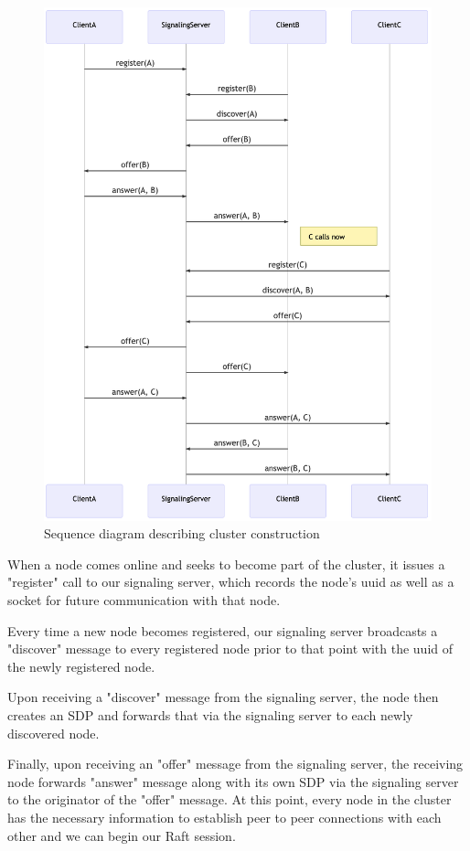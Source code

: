 \documentclass[11pt,twocolumn]{article}
\begin{document}
\begin{figure}[h]
    \centering
    \includegraphics[scale=0.32]{cluster}
    \caption{Sequence diagram describing cluster construction}
\end{figure}

When a node comes online and seeks to become part of the cluster, it issues a "register" call to our signaling server, which records the node's uuid as well as a socket for future communication with that node.

Every time a new node becomes registered, our signaling server broadcasts a "discover" message to every registered node prior to that point with the uuid of the newly registered node.

Upon receiving a "discover" message from the signaling server, the node then creates an SDP and forwards that via the signaling server to each newly discovered node.

Finally, upon receiving an "offer" message from the signaling server, the receiving node forwards "answer" message along with its own SDP via the signaling server to the originator of the "offer" message. At this point, every node in the cluster has the necessary information to establish peer to peer connections with each other and we can begin our Raft session.
\end{document}

